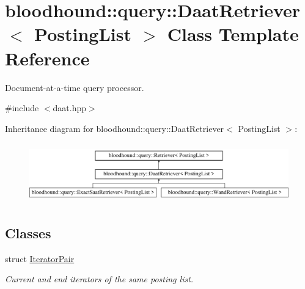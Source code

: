 \hypertarget{classbloodhound_1_1query_1_1DaatRetriever}{}\section{bloodhound\+:\+:query\+:\+:Daat\+Retriever$<$ Posting\+List $>$ Class Template Reference}
\label{classbloodhound_1_1query_1_1DaatRetriever}


Document-\/at-\/a-\/time query processor.  




{\ttfamily \#include $<$daat.\+hpp$>$}

Inheritance diagram for bloodhound\+:\+:query\+:\+:Daat\+Retriever$<$ Posting\+List $>$\+:\begin{figure}[H]
\begin{center}
\leavevmode
\includegraphics[height=2.608696cm]{classbloodhound_1_1query_1_1DaatRetriever}
\end{center}
\end{figure}
\subsection*{Classes}
\begin{DoxyCompactItemize}
\item 
struct \hyperlink{structbloodhound_1_1query_1_1DaatRetriever_1_1IteratorPair}{Iterator\+Pair}
\begin{DoxyCompactList}\small\item\em Current and end iterators of the same posting list. \end{DoxyCompactList}\end{DoxyCompactItemize}
